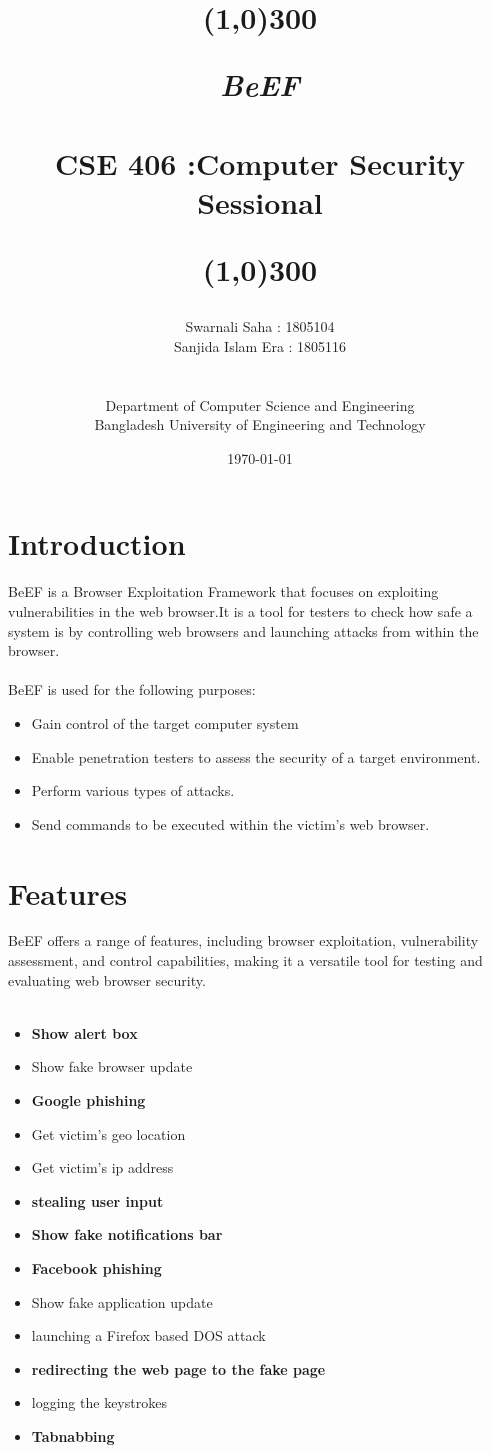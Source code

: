 \documentclass{report}
\title{
	\line(1,0){300}
	\endgraf\bigskip
	
	\begin{center}
		\Huge {\emph{BeEF} }\\\\
		\vspace{0.5cm}
		\large {CSE 406 :Computer Security Sessional}
		
	\end{center}
	\line(1,0){300}
	\bigskip
	\bigskip
}
\author{
    \large{Swarnali Saha : 1805104}\\
    \large{Sanjida Islam Era : 1805116}\\\\\\
    \Large{Department of Computer Science and Engineering}\\
    \Large{Bangladesh University of Engineering and Technology}\\
}
\date{
	\endgraf\bigskip
	\Large{\today}
}
\begin{document}
\maketitle


\tableofcontents


\chapter{Introduction}
BeEF is a Browser Exploitation Framework that focuses on exploiting vulnerabilities in the web browser.It is a tool for testers to check how safe a system is by controlling web browsers and launching attacks from within the browser.\\\\
BeEF is used for the following purposes:
\begin{itemize}
    \item Gain control of the target computer system
    \item Enable penetration testers to assess the security of a target environment.
    \item Perform various types of attacks.
    \item Send commands to be executed within the victim's web browser.
\end{itemize}


\chapter{Features}
BeEF offers a range of features, including browser exploitation, vulnerability assessment, and control capabilities, making it a versatile tool for testing and evaluating web browser security.\\\\
\begin{itemize}
\item \textbf{Show alert box}
\item Show fake browser update
\item \textbf{Google phishing}
\item Get victim’s geo location
\item Get victim’s ip address
\item \textbf{stealing user input}
\item \textbf{Show fake notifications bar}
\item \textbf{Facebook phishing}
\item Show fake application update
\item launching a Firefox based DOS attack
\item \textbf{redirecting the web page to the fake page}
\item logging the keystrokes 
\item \textbf{Tabnabbing}

\end{itemize}
\end{document}
